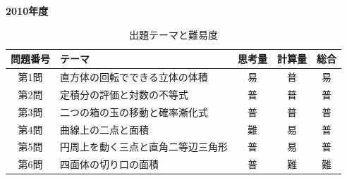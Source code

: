 \documentclass[../../main.tex]{subfiles}
\begin{document}
\begin{center}
  {\fontsize{48pt}{58pt}\selectfont \textbf{2010}\normalsize\textbf{年度}}
\end{center}

\begin{table}[htb]
  \centering
  \caption{出題テーマと難易度}
  \begin{tabular}{|c|p{6.2cm}|c|c|c|}
    \hline
    \textbf{問題番号} & \textbf{テーマ} & \textbf{思考量} & \textbf{計算量} & \textbf{総合} \\
    \hline
    第1問 & 直方体の回転でできる立体の体積 & 易 & 普 & 易 \\
    \hline
    第2問 & 定積分の評価と対数の不等式 & 普 & 普 & 普 \\
    \hline
    第3問 & 二つの箱の玉の移動と確率漸化式 & 普 & 普 & 普 \\
    \hline
    第4問 & 曲線上の二点と面積 & 難 & 易 & 普 \\
    \hline
    第5問 & 円周上を動く三点と直角二等辺三角形 & 普 & 易 & 普 \\
    \hline
    第6問 & 四面体の切り口の面積 & 普 & 難 & 難 \\
    \hline
  \end{tabular}
\end{table}
\end{document}
